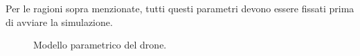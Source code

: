 Per le ragioni sopra menzionate, tutti questi parametri devono essere fissati prima di avviare la simulazione.

\begin{figure}[H] 
    \captionsetup{justification=centering, margin=2cm, font=footnotesize}
    \begin{center}
    \end{center}
    \caption{Modello parametrico del drone.}
    \label{modello_drone}
\end{figure}

